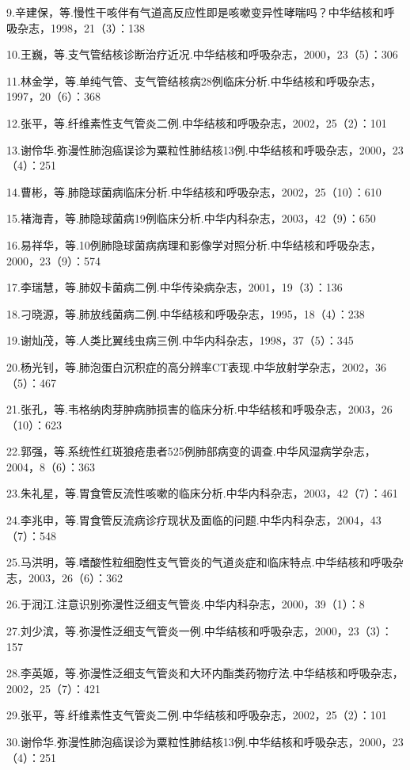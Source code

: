9.辛建保，等.慢性干咳伴有气道高反应性即是咳嗽变异性哮喘吗？中华结核和呼吸杂志，1998，21（3）：138

10.王巍，等.支气管结核诊断治疗近况.中华结核和呼吸杂志，2000，23（5）：306

11.林金学，等.单纯气管、支气管结核病28例临床分析.中华结核和呼吸杂志，1997，20（6）：368

12.张平，等.纤维素性支气管炎二例.中华结核和呼吸杂志，2002，25（2）：101

13.谢伶华.弥漫性肺泡癌误诊为粟粒性肺结核13例.中华结核和呼吸杂志，2000，23（4）：251

14.曹彬，等.肺隐球菌病临床分析.中华结核和呼吸杂志，2002，25（10）：610

15.褚海青，等.肺隐球菌病19例临床分析.中华内科杂志，2003，42（9）：650

16.易祥华，等.10例肺隐球菌病病理和影像学对照分析.中华结核和呼吸杂志，2000，23（9）：574

17.李瑞慧，等.肺奴卡菌病二例.中华传染病杂志，2001，19（3）：136

18.刁晓源，等.肺放线菌病二例.中华结核和呼吸杂志，1995，18（4）：238

19.谢灿茂，等.人类比翼线虫病三例.中华内科杂志，1998，37（5）：345

20.杨光钊，等.肺泡蛋白沉积症的高分辨率CT表现.中华放射学杂志，2002，36（5）：467

21.张孔，等.韦格纳肉芽肿病肺损害的临床分析.中华结核和呼吸杂志，2003，26（10）：623

22.郭强，等.系统性红斑狼疮患者525例肺部病变的调查.中华风湿病学杂志，2004，8（6）：363

23.朱礼星，等.胃食管反流性咳嗽的临床分析.中华内科杂志，2003，42（7）：461

24.李兆申，等.胃食管反流病诊疗现状及面临的问题.中华内科杂志，2004，43（7）：548

25.马洪明，等.嗜酸性粒细胞性支气管炎的气道炎症和临床特点.中华结核和呼吸杂志，2003，26（6）：362

26.于润江.注意识别弥漫性泛细支气管炎.中华内科杂志，2000，39（1）：8

27.刘少滨，等.弥漫性泛细支气管炎一例.中华结核和呼吸杂志，2000，23（3）：157

28.李英姬，等.弥漫性泛细支气管炎和大环内酯类药物疗法.中华结核和呼吸杂志，2002，25（7）：421

29.张平，等.纤维素性支气管炎二例.中华结核和呼吸杂志，2002，25（2）：101

30.谢伶华.弥漫性肺泡癌误诊为粟粒性肺结核13例.中华结核和呼吸杂志，2000，23（4）：251

